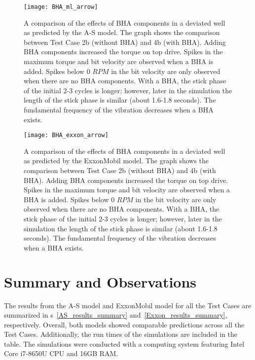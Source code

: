 \begin{figure}
	\centering
	\texttt{[image: BHA\_ml\_arrow]}
    \caption[Effects of BHA components in a deviated well from the A-S model]{A comparison of the effects of BHA components in a deviated well as predicted by the A-S model. The graph shows the comparison between Test Case 2b (without BHA) and 4b (with BHA). Adding BHA components increased the torque on top drive. Spikes in the maximum torque and bit velocity are observed when a BHA is added. Spikes below 0 $RPM$ in the bit velocity are only observed when there are no BHA components. With a BHA, the stick phase of the initial 2-3 cycles is longer; however, later in the simulation the length of the stick phase is similar (about 1.6-1.8 seconds). The fundamental frequency of the vibration decreases when a BHA exists.}
	\label{figure_BHA_Matlab}
\end{figure}

\begin{figure}
	\centering
	\texttt{[image: BHA\_exxon\_arrow]}
    \caption[Effects of BHA components in a deviated well from the ExxonMobil model]{A comparison of the effects of BHA components in a deviated well as predicted by the ExxonMobil model. The graph shows the comparison between Test Case 2b (without BHA) and 4b (with BHA). Adding BHA components increased the torque on top drive. Spikes in the maximum torque and bit velocity are observed when a BHA is added. Spikes below 0 $RPM$ in the bit velocity are only observed when there are no BHA components. With a BHA, the stick phase of the initial 2-3 cycles is longer; however, later in the simulation the length of the stick phase is similar (about 1.6-1.8 seconds). The fundamental frequency of the vibration decreases when a BHA exists.}
	\label{figure_BHA_EXXON}
\end{figure}

\section{Summary and Observations}
The results from the A-S model and ExxonMobil model for all the Test Cases are summarized in \tablename{}s~\ref{AS_results_summary} and~\ref{Exxon_results_summary}, respectively. Overall, both models showed comparable predictions across all the Test Cases. Additionally, the run times of the simulations are included in the table.  The simulations were conducted with a computing system featuring Intel\textsuperscript{\textregistered} Core\textsuperscript{\texttrademark} i7-8650U CPU and 16GB RAM\@.

